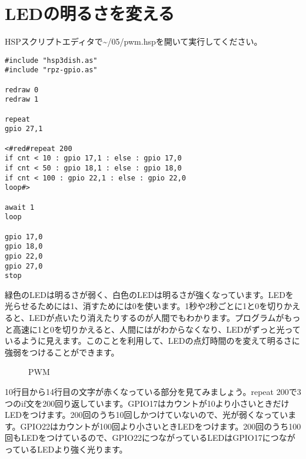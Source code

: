 \section{LEDの明るさを変える}
HSPスクリプトエディタで\textasciitilde /05/pwm.hspを開いて実行してください。\\

\begin{lstlisting}[caption=pwm.hsp,label=pwm.hsp]
#include "hsp3dish.as"
#include "rpz-gpio.as"

redraw 0
redraw 1

repeat
gpio 27,1

<#red#repeat 200
if cnt < 10 : gpio 17,1 : else : gpio 17,0
if cnt < 50 : gpio 18,1 : else : gpio 18,0
if cnt < 100 : gpio 22,1 : else : gpio 22,0
loop#>

await 1
loop

gpio 17,0
gpio 18,0
gpio 22,0
gpio 27,0
stop

\end{lstlisting}

緑色のLEDは明るさが弱く、白色のLEDは明るさが強くなっています。LEDを光らせるためには1、消すためには0を使います。1秒や2秒ごとに1と0を切りかえると、LEDが点いたり消えたりするのが人間でもわかります。プログラムがもっと高速に1と0を切りかえると、人間にはがわからなくなり、LEDがずっと光っているように見えます。このことを利用して、LEDの点灯時間のを変えて明るさに強弱をつけることができます。

\begin{figure}[H]
\centering

\caption{PWM}
\end{figure}

10行目から14行目の文字が赤くなっている部分を見てみましょう。repeat 200で3つのif文を200回り返しています。GPIO17はカウントが10より小さいときだけLEDをつけます。200回のうち10回しかつけていないので、光が弱くなっています。GPIO22はカウントが100回より小さいときLEDをつけます。200回のうち100回もLEDをつけているので、GPIO22につながっているLEDはGPIO17につながっているLEDより強く光ります。